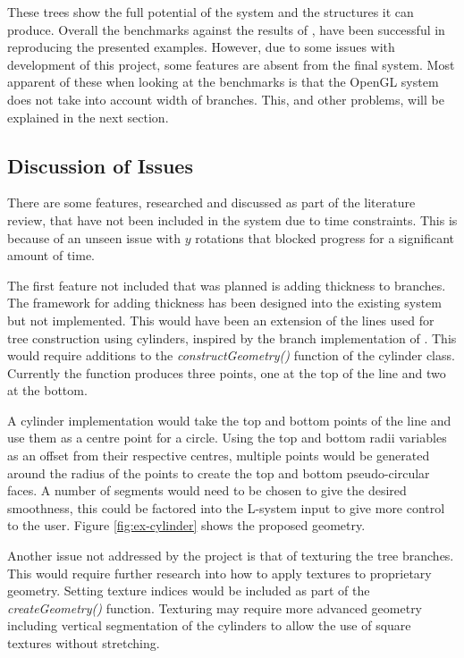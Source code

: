 \documentclass[final]{cmpreport}
\begin{document}
These trees show the full potential of the system and the structures it can produce. Overall the 
benchmarks against the results of \cite{prusinkiewicz1996systems}, have been successful in 
reproducing the presented examples. However, due to some issues with development of this project, 
some features are absent from the final system. Most apparent of these when looking at the benchmarks 
is that the OpenGL system does not take into account width of branches. This, and other problems, will 
be explained in the next section.

\subsection{Discussion of Issues}
There are some features, researched and discussed as part of the literature review, that have not 
been included in the system due to time constraints. This is because of an unseen issue with $y$ 
rotations that blocked progress for a significant amount of time.

The first feature not included that was planned is adding thickness to branches. The framework for 
adding thickness has been designed into the existing system but not implemented. This would have 
been an extension of the lines used for tree construction using cylinders, inspired by the branch 
implementation of \cite{weber1995rendering}. This would require additions to the 
\emph{constructGeometry()} function of the cylinder class. Currently the function produces 
three points, one at the top of the line and two at the bottom. 

A cylinder implementation would 
take the top and bottom points of the line and use them as a centre point for a circle. Using the 
top and bottom radii variables as an offset from their respective centres, multiple points would 
be generated around the radius of the points to create the top and bottom pseudo-circular faces. 
A number of segments would need to be chosen to give the desired smoothness, this could be factored 
into the L-system input to give more control to the user. Figure \ref{fig:ex-cylinder} shows the 
proposed geometry.

Another issue not addressed by the project is that of texturing the tree branches. This would require 
further research into how to apply textures to proprietary geometry. Setting texture indices would be 
included as part of the \emph{createGeometry()} function. Texturing may require more advanced geometry 
including vertical segmentation of the cylinders to allow the use of square textures without stretching.
\end{document}
